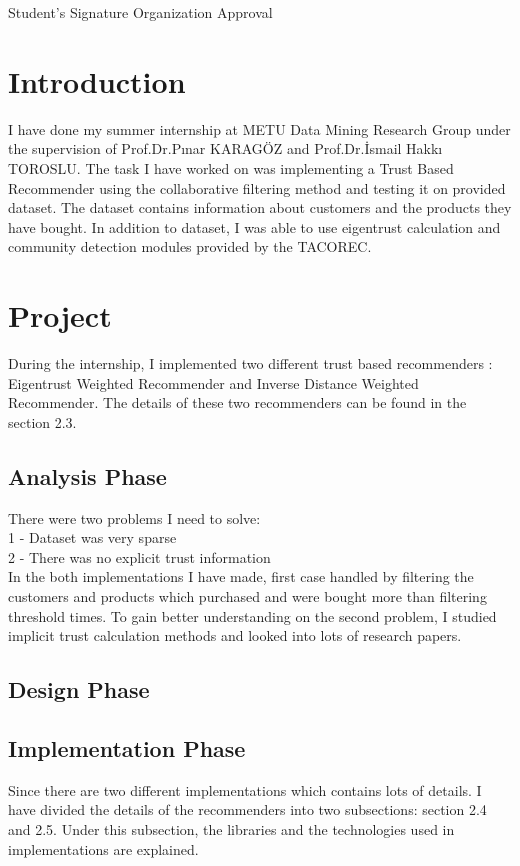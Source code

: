 \documentclass[12pt]{article}
\begin{document}
\begin{titlepage}
Student's Signature \hspace{150px} Organization Approval \\


\end{titlepage}


\tableofcontents          
\newpage

\section{Introduction}
I have done my summer internship at METU Data Mining Research Group under the supervision of Prof.Dr.Pınar KARAGÖZ and Prof.Dr.İsmail Hakkı TOROSLU. The task I have worked on was implementing a Trust Based Recommender using the collaborative filtering method and testing it on provided dataset. The dataset contains information about customers and the products they have bought. In addition to dataset, I was able to use eigentrust calculation and community detection modules provided by the TACOREC.

\section{Project}
During the internship, I implemented two different trust based recommenders : Eigentrust Weighted Recommender and Inverse Distance Weighted Recommender. The details of these two recommenders can be found in the section 2.3.

\subsection{Analysis Phase}
There were two problems I need to solve: \\
1 - Dataset was very sparse \\ 
2 - There was no explicit trust information \\
In the both implementations I have made, first case handled by filtering the customers and products which purchased and were bought more than filtering threshold times. To gain better understanding on the second problem, I studied implicit trust calculation methods and looked into lots of research papers.

\subsection{Design Phase}
\subsection{Implementation Phase}
Since there are two different implementations which contains lots of details. I have divided the details of the recommenders into two subsections: section 2.4 and 2.5. Under this subsection, the libraries and the technologies used in implementations are explained.
\end{document}
